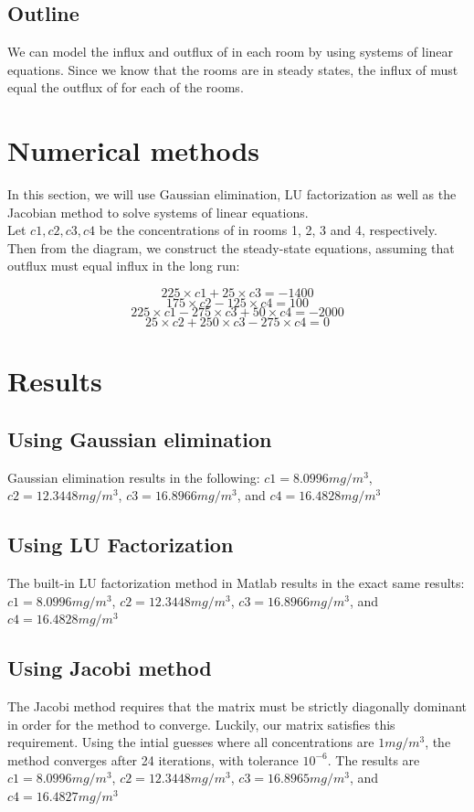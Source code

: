 \documentclass{article}
\begin{document}
	\subsection{Outline}
	We can model the influx and outflux of  in each room by using systems of linear equations. Since we know that the rooms are in steady states, the influx of  must equal the outflux of  for each of the rooms.
	
	\section{Numerical methods}
	In this section, we will use Gaussian elimination, LU factorization as well as the Jacobian method to solve systems of linear equations.\\
	
	Let ${c1, c2, c3, c4}$ be the concentrations of  in rooms 1, 2, 3 and 4, respectively. Then from the diagram, we construct the steady-state equations, assuming that outflux must equal influx in the long run:
	
	\[225{\times}c1 + 25{\times}c3 = -1400\]
	\[175{\times}c2 - 125{\times}c4 = 100\]
	\[225{\times}c1 - 275{\times}c3 + 50{\times}c4 = -2000\]
	\[25{\times}c2 + 250{\times}c3 - 275{\times}c4 = 0\]
	
	\section{Results}
    
    \subsection{Using Gaussian elimination}
    Gaussian elimination results in the following:
    ${c1 = 8.0996 mg/m^3}$, ${c2 = 12.3448 mg/m^3}$, ${c3 = 16.8966 mg/m^3}$, and ${c4 = 16.4828 mg/m^3}$
    \subsection{Using LU Factorization}
    The built-in LU factorization method in Matlab results in the exact same results:
    ${c1 = 8.0996 mg/m^3}$, ${c2 = 12.3448 mg/m^3}$, ${c3 = 16.8966 mg/m^3}$, and ${c4 = 16.4828 mg/m^3}$
    \subsection{Using Jacobi method}
    The Jacobi method requires that the matrix must be strictly diagonally dominant in order for the method to converge. Luckily, our matrix satisfies this requirement. Using the intial guesses where all concentrations are ${1 mg/m^3}$, the method converges after 24 iterations, with tolerance ${10^{-6}}$. The results are  ${c1 = 8.0996 mg/m^3}$, ${c2 = 12.3448 mg/m^3}$, ${c3 = 16.8965 mg/m^3}$, and ${c4 = 16.4827 mg/m^3}$
\end{document}
